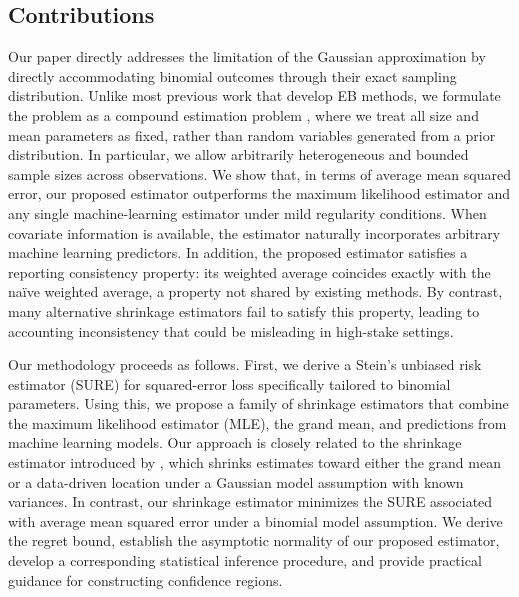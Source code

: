 \documentclass[12pt,letterpaper]{article}
\begin{document}
\subsection{Contributions}
Our paper directly addresses the limitation of the Gaussian approximation by directly accommodating binomial outcomes through their exact sampling distribution. Unlike most previous work that develop EB methods, we formulate the problem as a compound estimation problem \citep{robbins1951asymptotic}, where we treat all size and mean parameters as fixed, rather than random variables generated from a prior distribution. In particular, we allow arbitrarily heterogeneous and bounded sample sizes across observations. We show that, in terms of average mean squared error, our proposed estimator outperforms the maximum likelihood estimator and any single machine-learning estimator under mild regularity conditions. When covariate information is available, the estimator naturally incorporates arbitrary machine learning predictors. In addition, the proposed estimator satisfies a reporting consistency property: its weighted average coincides exactly with the naïve weighted average, a property not shared by existing methods. By contrast, many alternative shrinkage estimators fail to satisfy this property, leading to accounting inconsistency that could be misleading in high-stake settings.

Our methodology proceeds as follows. First, we derive a Stein’s unbiased risk estimator (SURE) for squared-error loss specifically tailored to binomial parameters. Using this, we propose a family of shrinkage estimators that combine the maximum likelihood estimator (MLE), the grand mean, and predictions from machine learning models. Our approach is closely related to the shrinkage estimator introduced by \citet{xie2012sure}, which shrinks estimates toward either the grand mean or a data-driven location under a Gaussian model assumption with known variances. In contrast, our shrinkage estimator minimizes the SURE associated with average mean squared error under a binomial model assumption. We derive the regret bound, establish the asymptotic normality of our proposed estimator, develop a corresponding statistical inference procedure, and provide practical guidance for constructing confidence regions. 
\end{document}
